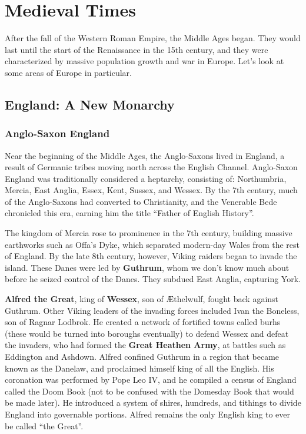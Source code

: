 \chapter{Medieval Times}

After the fall of the Western Roman Empire, the Middle Ages began.
They would last until the start of the Renaissance in the 15th century,
and they were characterized by massive population growth and war in Europe.
Let's look at some areas of Europe in particular.

\section{England: A New Monarchy}

\subsection*{Anglo-Saxon England}

Near the beginning of the Middle Ages, the Anglo-Saxons lived in England,
a result of Germanic tribes moving north across the English Channel.
Anglo-Saxon England was traditionally considered a heptarchy, consisting of:
Northumbria, Mercia, East Anglia, Essex, Kent, Sussex, and Wessex.
By the 7th century, much of the Anglo-Saxons had converted to Christianity,
and the Venerable Bede chronicled this era, earning him the title ``Father of English History''.

The kingdom of Mercia rose to prominence in the 7th century, building massive earthworks such as
Offa's Dyke, which separated modern-day Wales from the rest of England.
By the late 8th century, however, Viking raiders began to invade the island.
These Danes were led by \textbf{Guthrum}, whom we don't know much about before he seized control of the Danes.
They subdued East Anglia, capturing York.

\textbf{Alfred the Great}, king of \textbf{Wessex}, son of \AE{}thelwulf, fought back against Guthrum.
Other Viking leaders of the invading forces included Ivan the Boneless, son of Ragnar Lodbrok.
He created a network of fortified towns called burhs (these would be turned into boroughs eventually)
to defend Wessex and defeat the invaders, who had formed the \textbf{Great Heathen Army},
at battles such as Eddington and Ashdown.
Alfred confined Guthrum in a region that became known as the Danelaw, and proclaimed himself king of all the English.
His coronation was performed by Pope Leo IV,
and he compiled a census of England called the Doom Book
(not to be confused with the Domesday Book that would be made later).
He introduced a system of shires, hundreds, and tithings to divide England into governable portions.
Alfred remains the only English king to ever be called ``the Great''.

